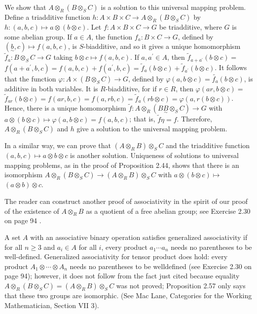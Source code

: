 \documentclass[10pt, letterpaper]{article}
\begin{document}
We show that $A \otimes_{R}\left(B \otimes_{S} C\right)$ is a solution to this universal mapping problem. Define a triadditive function $h: A \times B \times C \rightarrow A \otimes_{R}\left(B \otimes_{S} C\right)$ by $h:(a, b, c) \mapsto a \otimes(b \otimes c)$. Let $f: A \times B \times C \rightarrow G$ be triadditive, where $G$ is some abelian group. If $a \in A$, the function $f_{a}: B \times C \rightarrow G$, defined by $(\underset{\sim}{b}, c) \mapsto f(a, b, c)$, is $S$-biadditive, and so it gives a unique homomorphism $\tilde{f}_{a}: B \otimes_{S} C \rightarrow G$ taking $b \otimes c \mapsto f(a, b, c)$. If $a, a^{\prime} \in A$, then $\tilde{f}_{a+a^{\prime}}(b \otimes c)=$ $f\left(a+a^{\prime}, b, c\right)=f(a, b, c)+f\left(a^{\prime}, b, c\right)=\widetilde{f}_{a}(b \otimes c)+\widetilde{f}_{a^{\prime}}(b \otimes c)$. It follows that the function $\varphi: A \times\left(B \otimes_{S} C\right) \rightarrow G$, defined by $\varphi(a, b \otimes c)=\widetilde{f_{a}}(b \otimes c)$, is additive in both variables. It is $R$-biadditive, for if $r \in R$, then $\varphi(a r, b \otimes c)=$ $\tilde{f}_{a r}(b \otimes c)=f(a r, b, c)=f(a, r b, c)=\tilde{f}_{a}(r b \otimes c)=\varphi(a, r(b \otimes c))$. Hence, there is a unique homomorphism $\tilde{f}: A \otimes_{R}\left(B \underset{\sim}{B} \otimes_{S} C\right) \rightarrow G$ with $a \otimes(b \otimes c) \mapsto \varphi(a, b \otimes c)=f(a, b, c)$; that is, $\widetilde{f} \eta=f$. Therefore, $A \otimes_{R}\left(B \otimes_{S} C\right)$ and $h$ give a solution to the universal mapping problem.

In a similar way, we can prove that $\left(A \otimes_{R} B\right) \otimes_{S} C$ and the triadditive function $(a, b, c) \mapsto a \otimes b \otimes c$ is another solution. Uniqueness of solutions to universal mapping problems, as in the proof of Proposition 2.44, shows that there is an isomorphism $A \otimes_{R}\left(B \otimes_{S} C\right) \rightarrow\left(A \otimes_{R} B\right) \otimes_{S} C$ with $a \otimes(b \otimes c) \mapsto$ $(a \otimes b) \otimes c$.

The reader can construct another proof of associativity in the spirit of our proof of the existence of $A \otimes_{R} B$ as a quotient of a free abelian group; see Exercise 2.30 on page 94 .

A set $A$ with an associative binary operation satisfies generalized associativity if for all $n \geq 3$ and $a_{i} \in A$ for all $i$, every product $a_{1} \cdots a_{n}$ needs no parentheses to be well-defined. Generalized associativity for tensor product does hold: every product $A_{1} \otimes \cdots \otimes A_{n}$ needs no parentheses to be welldefined (see Exercise 2.30 on page 94); however, it does not follow from the fact just cited because equality $A \otimes_{R}\left(B \otimes_{S} C\right)=\left(A \otimes_{R} B\right) \otimes_{S} C$ was not proved; Proposition 2.57 only says that these two groups are isomorphic. (See Mac Lane, Categories for the Working Mathematician, Section VII 3).
\end{document}
